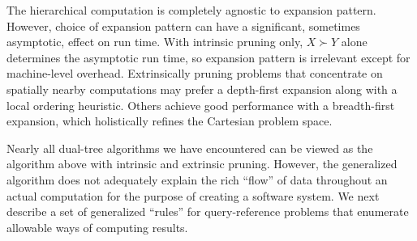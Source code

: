 \documentclass[twoside,leqno,twocolumn]{article}
\newcommand{\prefsplit}[2]{#1 \succ #2}
\newcommand{\gnp}{\psi}
\newcommand{\kdroot}[1]{#1^{\text{root}}}
\begin{document}

The hierarchical computation is completely agnostic to expansion pattern.
However, choice of expansion pattern can have a significant, sometimes asymptotic, effect on run time.
With intrinsic pruning only, $\prefsplit{X}{Y}$ alone determines the asymptotic run time, so expansion pattern is irrelevant except for machine-level overhead.
Extrinsically pruning problems that concentrate on spatially nearby computations may prefer a depth-first expansion along with a local ordering heuristic.
Others achieve good performance with a breadth-first expansion, which holistically refines the Cartesian problem space.

Nearly all dual-tree algorithms we have encountered can be viewed as the algorithm above with intrinsic and extrinsic pruning.
However, the generalized algorithm does not adequately explain the rich ``flow'' of data throughout an actual computation for the purpose of creating a software system.
We next describe a set of generalized ``rules'' for query-reference problems that enumerate allowable ways of computing results.




\end{document}
